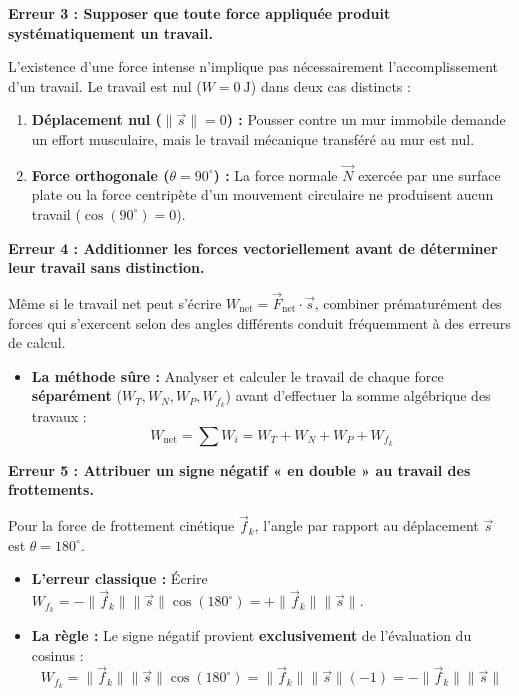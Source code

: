\documentclass[11pt,openany]{book}
\begin{document}
\begin{erreur}
\textbf{Erreur 3 : Supposer que toute force appliquée produit systématiquement un travail.}

L'existence d'une force intense n'implique pas nécessairement l'accomplissement d'un travail. Le travail est nul ($W = 0\ \mathrm{J}$) dans deux cas distincts :
\begin{enumerate}
    \item \textbf{Déplacement nul ($\|\vec{s}\| = 0$) :} Pousser contre un mur immobile demande un effort musculaire, mais le travail mécanique transféré au mur est nul.
    \item \textbf{Force orthogonale ($\theta = 90^\circ$) :} La force normale $\vec{N}$ exercée par une surface plate ou la force centripète d'un mouvement circulaire ne produisent aucun travail ($\cos(90^\circ) = 0$).
\end{enumerate}
\end{erreur}

\begin{erreur}
\textbf{Erreur 4 : Additionner les forces vectoriellement avant de déterminer leur travail sans distinction.}

Même si le travail net peut s'écrire $W_{\text{net}} = \vec{F}_{\text{net}} \cdot \vec{s}$, combiner prématurément des forces qui s'exercent selon des angles différents conduit fréquemment à des erreurs de calcul.
\begin{itemize}
    \item \textbf{La méthode sûre :} Analyser et calculer le travail de chaque force \textbf{séparément} ($W_T, W_N, W_P, W_{f_k}$) avant d'effectuer la somme algébrique des travaux :
    \[
    W_{\text{net}} = \sum W_i = W_T + W_N + W_P + W_{f_k}
    \]
\end{itemize}
\end{erreur}

\begin{erreur}
\textbf{Erreur 5 : Attribuer un signe négatif « en double » au travail des frottements.}

Pour la force de frottement cinétique $\vec{f}_k$, l'angle par rapport au déplacement $\vec{s}$ est $\theta = 180^\circ$.
\begin{itemize}
    \item \textbf{L'erreur classique :} Écrire $W_{f_k} = -\|\vec{f}_k\| \|\vec{s}\| \cos(180^\circ) = +\|\vec{f}_k\| \|\vec{s}\|$.
    \item \textbf{La règle :} Le signe négatif provient \textbf{exclusivement} de l'évaluation du cosinus : 
    \[
    W_{f_k} = \|\vec{f}_k\| \|\vec{s}\| \cos(180^\circ) = \|\vec{f}_k\| \|\vec{s}\| (-1) = -\|\vec{f}_k\| \|\vec{s}\|
    \]
\end{itemize}
\end{erreur}
\end{document}
